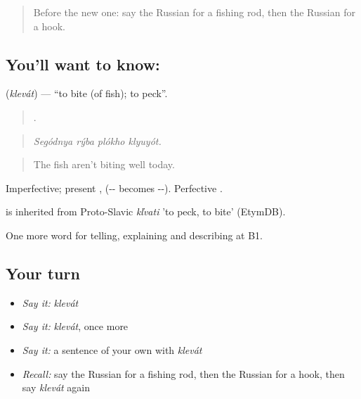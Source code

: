 \label{lesson:RU-C505-klevat}



\begin{quote}
Before the new one: say the Russian for a fishing rod, then the Russian for a hook.
\end{quote}

\subsection*{You'll want to know: }
\textbf{} (\emph{klevát}) — \textquotedblleft{}to bite (of fish); to peck\textquotedblright{}.

\begin{quote}
   .
\end{quote}

\begin{quote}
\emph{Segódnya rýba plókho klyuyót.}
\end{quote}

\begin{quote}
The fish aren't biting well today.
\end{quote}

Imperfective; present ,  (-- becomes --). Perfective .

\begin{cousinweb}
\emph{} is inherited from Proto-Slavic \emph{kľvati} 'to peck, to bite' (EtymDB).
\end{cousinweb}

\begin{grammarlens}[title={What you've built}]
One more word for telling, explaining and describing at B1.
\end{grammarlens}

\subsection*{Your turn}
\begin{itemize}
\raggedright
  \item \emph{Say it:} \emph{klevát}
  \item \emph{Say it:} \emph{klevát}, once more
  \item \emph{Say it:} a sentence of your own with \emph{klevát}
  \item \emph{Recall:} say the Russian for a fishing rod, then the Russian for a hook, then say \emph{klevát} again
\end{itemize}

